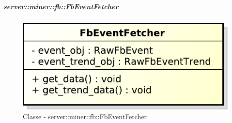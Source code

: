 		\subparagraph{server::miner::fb::FbEventFetcher} %
		\label{subp:server_miner_fb_FbEventFetcher}
		    \begin{figure}[!htbp]
 		 		\centering
 				\centerline{\includegraphics[scale=0.75]{./images/server/classes/miner/fb_event_fetcher.pdf}}
 				\caption{Classe - server::miner::fb::FbEventFetcher}
			\end{figure}
